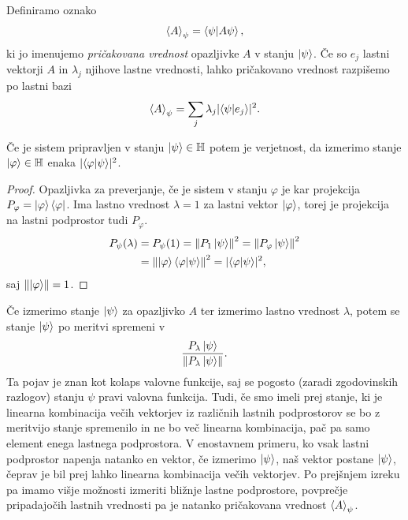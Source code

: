 \documentclass[mat1]{fmfdelo}
\newcommand{\Hb}{\mathbb H}
\begin{document}
Definiramo oznako
\begin{align*}
    \ev{A}_\psi = \braket{\psi}{A\psi},
\end{align*}
ki jo imenujemo \emph{pričakovana vrednost} opazljivke \(A\) v stanju \(\ket\psi\). Če so \(e_j\) lastni vektorji \(A\) in \(\lambda_j\) njihove lastne vrednosti, lahko pričakovano vrednost razpišemo po lastni bazi
\begin{align*}
    \ev{A}_\psi = \sum_j\lambda_j\lvert \braket{\psi}{e_j}\rvert^2.
\end{align*}

\begin{izrek}
    Če je sistem pripravljen v stanju \(\ket\psi \in \Hb\) potem je verjetnost, da izmerimo stanje \(\ket\varphi \in \Hb\) enaka \(\lvert \braket{\varphi}{\psi}\rvert^2\).
\end{izrek}
\begin{proof}
    Opazljivka za preverjanje, če je sistem v stanju \(\varphi\) je kar projekcija \(P_\varphi = \ket\varphi \bra\varphi\). Ima lastno vrednost \(\lambda=1\) za lastni vektor \(\ket\varphi\), torej je projekcija na lastni podprostor tudi \(P_\varphi\).
    \begin{align*}
        P_\psi (\lambda) &= P_\psi(1) =\norm{P_1\ket\psi}^2 = \norm{P_\varphi\ket\psi}^2\\
                        &= \norm{\ket\varphi\braket{\varphi}{\psi}}^2 = \lvert \braket{\varphi}{\psi}\rvert^2,
    \end{align*}
    saj \(\norm{\ket\varphi} = 1\).
\end{proof}

Če izmerimo stanje \(\ket\psi\) za opazljivko \(A\) ter izmerimo lastno vrednost \(\lambda\), potem se stanje \(\ket\psi\) po meritvi spremeni v
\begin{align*}
    \frac{P_\lambda \ket\psi}{\norm{P_\lambda\ket\psi}}.
\end{align*}
Ta pojav je znan kot kolaps valovne funkcije, saj se pogosto (zaradi zgodovinskih razlogov) stanju \(\psi\) pravi valovna funkcija. Tudi, če smo imeli prej stanje, ki je linearna kombinacija večih vektorjev iz različnih lastnih podprostorov se bo z meritvijo stanje spremenilo in ne bo več linearna kombinacija, pač pa samo element enega lastnega podprostora. V enostavnem primeru, ko vsak lastni podprostor napenja natanko en vektor, če izmerimo \(\ket\psi\), naš vektor postane \(\ket\psi\), čeprav je bil prej lahko linearna kombinacija večih vektorjev. Po prejšnjem izreku pa imamo višje možnosti izmeriti bližnje lastne podprostore, povprečje pripadajočih lastnih vrednosti pa je natanko pričakovana vrednost \(\ev{A}_\psi\).
\end{document}
